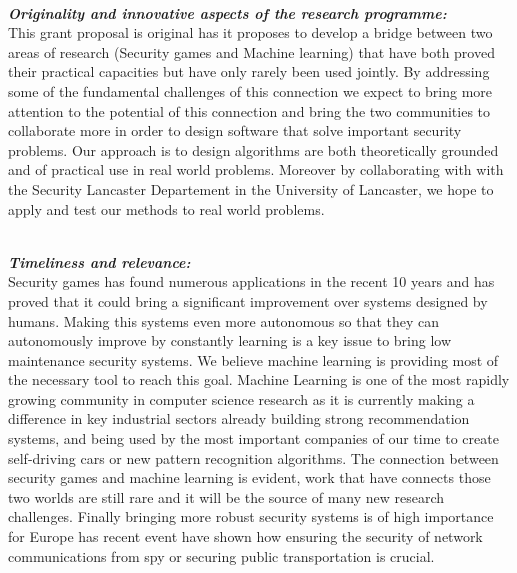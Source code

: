 
\noindent \textbf{\textit{\\Originality and innovative aspects of the research programme:}}\\
This grant proposal is original has it proposes to develop a bridge between two areas of research (Security games and Machine learning) that have both proved their practical capacities but have only rarely been used jointly. By addressing some of the fundamental challenges of this connection we expect to bring more attention to the potential of this connection and bring the two communities to collaborate more in order to design software that solve important security problems.
Our approach is to design algorithms are both theoretically grounded and of practical use in real world problems.
Moreover by collaborating with with the Security Lancaster Departement in the University of Lancaster, we hope to apply and test our methods to real world problems.
 
\noindent \textbf{\textit{\\Timeliness and relevance:}}\\
Security games has found numerous applications in the recent 10 years and has proved that it could bring a significant improvement over  systems designed by humans. Making this systems even more autonomous so that they can autonomously improve by constantly learning is a key issue to bring low maintenance security systems. We believe machine learning is providing most of the necessary tool to reach this goal. Machine Learning is one of the most rapidly growing community in computer science research as it is currently making a difference in key industrial sectors already  building strong recommendation systems, and being used by the most important companies of our time to create self-driving cars or new pattern recognition algorithms.   The connection between security games and machine learning is evident, work that have connects those two worlds are still rare and it will be the source of many new research challenges. 
Finally bringing more robust security systems is of high importance for Europe has recent event have shown how ensuring the security of network communications from spy or securing public transportation is crucial.
 